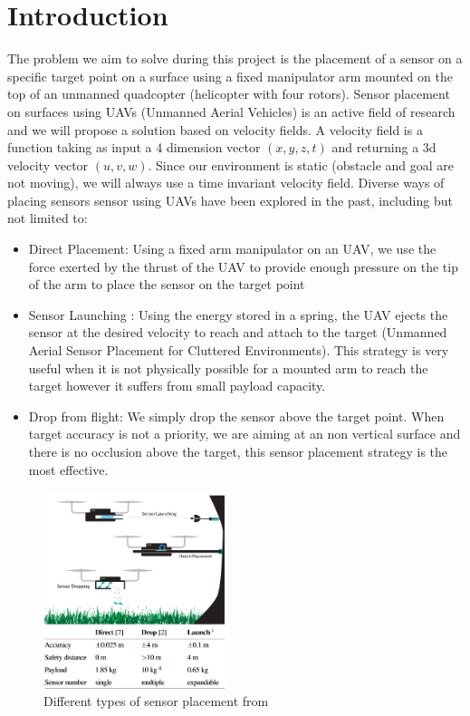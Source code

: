 \section{Introduction}




The problem we aim to solve during this project is the placement of a sensor on a specific target point on a surface using a fixed manipulator arm mounted on the top of an unmanned quadcopter (helicopter with four rotors). 
Sensor placement on surfaces using UAVs (Unmanned Aerial Vehicles) is an active field of research and we will propose a solution based on velocity fields.
A velocity field is a function taking as input  a 4 dimension vector $(x,y,z,t)$ and returning a 3d velocity vector $(u,v,w)$. Since our environment is static (obstacle and goal are not moving), we will always use a time invariant velocity field.
Diverse ways of placing sensors sensor using UAVs have been explored in the past, including but not limited to: 
\begin{itemize}
    \item Direct Placement: Using a fixed arm manipulator on an UAV, we use the force exerted by the thrust of the UAV to provide enough pressure on the tip of the arm to place the sensor on the target point
    \item Sensor Launching \cite{farinha2020unmanned}: Using the energy stored in a spring, the UAV ejects the sensor at the desired velocity to reach and attach to the target (Unmanned Aerial Sensor Placement for Cluttered Environments). This strategy is very useful when it is not physically possible for a mounted arm to reach the target however it suffers from small payload capacity.
    \item Drop from flight: We simply drop the sensor above the target point. When target accuracy is not a priority, we are aiming at an non vertical surface and there is no occlusion above the target,  this sensor placement strategy is the most effective. 
\end{itemize}
\begin{figure}[h!]
    \centering
    \includegraphics[width=0.48\textwidth]{Images/threeway.png}
    \caption{Different types of sensor placement from \cite{farinha2020unmanned}}
    \label{fig:threeway}
\end{figure}
